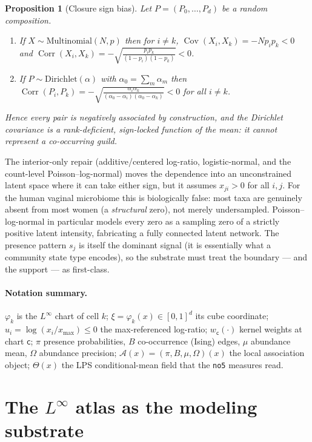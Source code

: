 \documentclass[11pt]{article}
\theoremstyle{definition}
\theoremstyle{plain}
\newtheorem{proposition}[definition]{Proposition}
\theoremstyle{remark}
\newcommand{\Linf}{L^{\infty}}
\newcommand{\Cov}{\operatorname{Cov}}
\newcommand{\Corr}{\operatorname{Corr}}
\newcommand{\chart}{\varphi}
\newcommand{\1}{\mathbf{1}}
\newcommand{\Prec}{\Omega}
\newcommand{\Pres}{\pi}
\newcommand{\Edge}{B}
\newcommand{\Field}{\mathcal{A}}
\newcommand{\cc}{\mathsf{c}}              %
\begin{document}
\begin{proposition}[Closure sign bias]\label{prop:closure}
Let $P=(P_0,\dots,P_d)$ be a random composition.
\begin{enumerate}[label=(\alph*)]
\item If $X\sim\mathrm{Multinomial}(N,p)$ then for $i\neq k$,
  $\Cov(X_i,X_k)=-Np_ip_k<0$ and
  $\Corr(X_i,X_k)=-\sqrt{\tfrac{p_ip_k}{(1-p_i)(1-p_k)}}<0$.
\item If $P\sim\mathrm{Dirichlet}(\alpha)$ with $\alpha_0=\sum_m\alpha_m$ then
  $\Corr(P_i,P_k)=-\sqrt{\tfrac{\alpha_i\alpha_k}{(\alpha_0-\alpha_i)(\alpha_0-\alpha_k)}}<0$
  for all $i\neq k$.
\end{enumerate}
Hence every pair is negatively associated by construction, and the
Dirichlet covariance is a rank-deficient, sign-locked function of the mean: it
cannot represent a co-occurring guild.
\end{proposition}

The interior-only repair (additive/centered log-ratio, logistic-normal, and the
count-level Poisson--log-normal) moves the dependence into an unconstrained
latent space where it can take either sign, but it assumes
$x_{ji}>0$ for all $i,j$. For the human vaginal microbiome this is biologically
false: most taxa are genuinely absent from most women (a \emph{structural}
zero), not merely undersampled. Poisson--log-normal in particular models every
zero as a sampling zero of a strictly positive latent intensity, fabricating a
fully connected latent network. The presence pattern $s_j$ is itself the
dominant signal (it is essentially what a community state type encodes), so the
substrate must treat the boundary --- and the support --- as first-class.

\paragraph{Notation summary.}
$\chart_k$ is the $\Linf$ chart of cell $k$; $\xi=\chart_k(x)\in[0,1]^d$ its cube
coordinate; $u_i=\log(x_i/x_{\max})\le 0$ the max-referenced log-ratio;
$w_{\cc}(\cdot)$ kernel weights at chart $\cc$; $\Pres$ presence probabilities,
$\Edge$ co-occurrence (Ising) edges, $\mu$ abundance mean, $\Prec$ abundance
precision; $\Field(x)=(\Pres,\Edge,\mu,\Prec)(x)$ the local association object;
$\Theta(x)$ the LPS conditional-mean field that the \texttt{no5} measures read.

\section{The $\Linf$ atlas as the modeling substrate}\label{sec:atlas}
\end{document}

